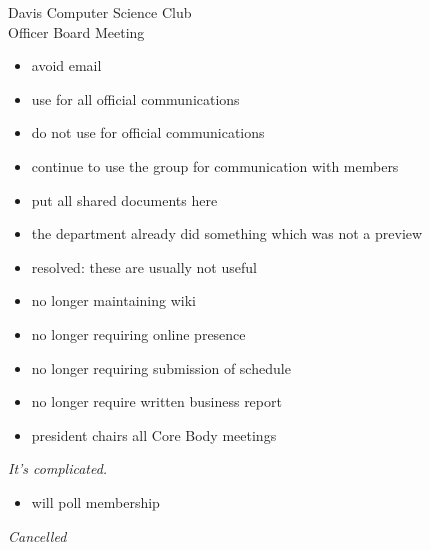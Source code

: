 \documentclass{article}
\newcommand{\hindsight}{\textit}
\begin{document}
\begin{Minutes}{Davis Computer Science Club\\Officer Board Meeting}
\begin{itemize}
\item avoid email
\end{itemize}
\begin{itemize}
\item use for all official communications
\end{itemize}
\begin{itemize}
\item do not use for official communications
\item continue to use the group for communication with members
\end{itemize}
\begin{itemize}
\item put all shared documents here
\end{itemize}

\begin{itemize}
\item the department already did something which was not a preview
\end{itemize}

\begin{itemize}
\item resolved: these are usually not useful
\end{itemize}

\begin{itemize}
\item no longer maintaining wiki
\item no longer requiring online presence
\item no longer requiring submission of schedule
\item no longer require written business report
\item president chairs all Core Body meetings
\end{itemize}

\hindsight{It's complicated.}
\begin{itemize}
\item will poll membership
\end{itemize}

\hindsight{Cancelled}


\thispagestyle{creditfooter}
\end{Minutes}
\end{document}
